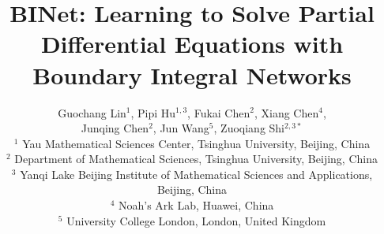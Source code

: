 \documentclass[hyperref]{article}
\numberwithin{equation}{section}
\theoremstyle{nonumberplain}
\begin{document}
	\title{\bf BINet: Learning to Solve Partial Differential Equations with Boundary Integral Networks} 
	\date{}
	\author{\sffamily Guochang Lin$^1$, Pipi Hu$^{1,3}$, Fukai Chen$^2$, Xiang Chen$^{4}$, \\\sffamily Junqing Chen$^{2}$, Jun Wang$^{5}$, Zuoqiang Shi$^{2,3*}$ \\
		{\sffamily\small $^1$ Yau Mathematical Sciences Center, Tsinghua University, Beijing, China}\\
		{\sffamily\small $^2$ Department of Mathematical Sciences, Tsinghua University, Beijing, China}\\
		{\sffamily\small $^3$ Yanqi Lake Beijing Institute of Mathematical Sciences and Applications, Beijing, China}\\
		{\sffamily\small $^4$ Noah’s Ark Lab, Huawei, China}\\
		{\sffamily\small $^5$ University College London, London, United Kingdom}}
	\renewcommand{\thefootnote}{\fnsymbol{footnote}}
	\maketitle
	
\end{document}
